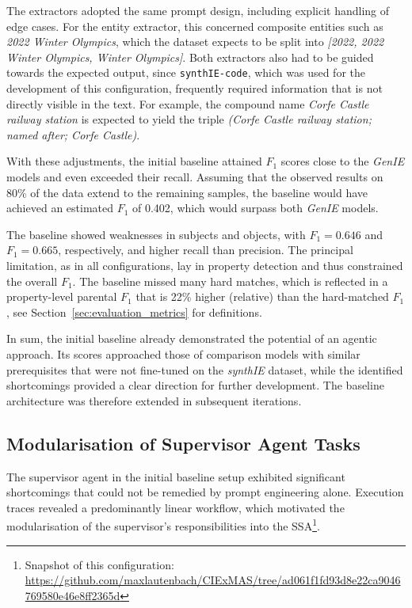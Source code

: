 \documentclass[a4paper,oneside,bibliography=totoc]{scrbook}
\begin{document}
The extractors adopted the same prompt design, including explicit handling of edge cases. For the entity extractor, this concerned composite entities such as \textit{2022 Winter Olympics}, which the dataset expects to be split into \textit{[2022, 2022 Winter Olympics, Winter Olympics]}. Both extractors also had to be guided towards the expected output, since \texttt{synthIE-code}, which was used for the development of this configuration, frequently required information that is not directly visible in the text. For example, the compound name \textit{Corfe Castle railway station} is expected to yield the triple \textit{(Corfe Castle railway station; named after; Corfe Castle)}.

With these adjustments, the initial baseline attained $F_{1}$ scores close to the \textit{GenIE} models and even exceeded their recall. Assuming that the observed results on 80\% of the data extend to the remaining samples, the baseline would have achieved an estimated $F_{1}$ of 0.402, which would surpass both \textit{GenIE} models.

The baseline showed weaknesses in subjects and objects, with $F_{1}=0.646$ and $F_{1}=0.665$, respectively, and higher recall than precision. The principal limitation, as in all configurations, lay in property detection and thus constrained the overall $F_{1}$. The baseline missed many hard matches, which is reflected in a property-level parental $F_{1}$ that is 22\% higher (relative) than the hard-matched $F_{1}$, see Section~\ref{sec:evaluation_metrics} for definitions.

In sum, the initial baseline already demonstrated the potential of an agentic approach. Its scores approached those of comparison models with similar prerequisites that were not fine-tuned on the \textit{synthIE} dataset, while the identified shortcomings provided a clear direction for further development. The baseline architecture was therefore extended in subsequent iterations.

\subsection{Modularisation of Supervisor Agent Tasks}
\label{subsec:modularization_agent_tasks}

The supervisor agent in the initial baseline setup exhibited significant shortcomings that could not be remedied by prompt engineering alone. Execution traces revealed a predominantly linear workflow, which motivated the modularisation of the supervisor’s responsibilities into the \ac{SSA}\footnote{Snapshot of this configuration: \url{https://github.com/maxlautenbach/CIExMAS/tree/ad061f1fd93d8e22ca9046769580e46e8ff2365d}}.
\end{document}
